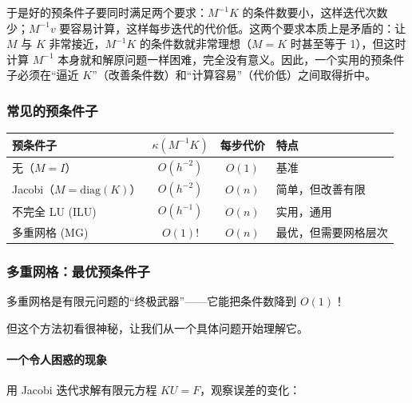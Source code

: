 于是好的预条件子要同时满足两个要求：$M^{-1}K$ 的条件数要小，这样迭代次数少；$M^{-1}v$ 要容易计算，这样每步迭代的代价低。这两个要求本质上是矛盾的：让 $M$ 与 $K$ 非常接近，$M^{-1}K$ 的条件数就非常理想（$M = K$ 时甚至等于 1），但这时计算 $M^{-1}$ 本身就和解原问题一样困难，完全没有意义。因此，一个实用的预条件子必须在“逼近 $K$”（改善条件数）和“计算容易”（代价低）之间取得折中。

\subsubsection*{常见的预条件子}

\begin{center}
\renewcommand{\arraystretch}{1.5}
\begin{tabular}{l|c|c|l}
\toprule
预条件子 & $\kappa(M^{-1}K)$ & 每步代价 & 特点 \\
\midrule
无（$M = I$） & $O(h^{-2})$ & $O(1)$ & 基准 \\
Jacobi（$M = \text{diag}(K)$） & $O(h^{-2})$ & $O(n)$ & 简单，但改善有限 \\
不完全 LU (ILU) & $O(h^{-1})$ & $O(n)$ & 实用，通用 \\
多重网格 (MG) & $O(1)$! & $O(n)$ & 最优，但需要网格层次 \\
\bottomrule
\end{tabular}
\end{center}

\subsubsection*{多重网格：最优预条件子}

多重网格是有限元问题的“终极武器”——它能把条件数降到 $O(1)$！

但这个方法初看很神秘，让我们从一个具体问题开始理解它。

\paragraph{一个令人困惑的现象}

用 Jacobi 迭代求解有限元方程 $KU = F$，观察误差的变化：

